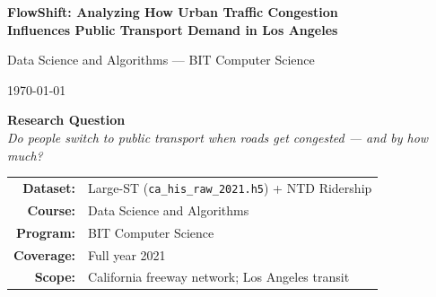 \documentclass[12pt,a4paper]{article}
\begin{document}
\begin{titlepage}
    \centering
    \vspace*{3cm}

    {\fontsize{14}{18}\selectfont\bfseries
    FlowShift: Analyzing How Urban Traffic Congestion\\[8pt]
    Influences Public Transport Demand in Los Angeles\par}

    \vspace{1.2cm}

    {\normalsize Data Science and Algorithms --- BIT Computer Science\par}

    \vspace{0.5cm}

    {\normalsize \today\par}

    \vspace{2cm}

    \begin{tcolorbox}[highlight, width=12cm]
        \centering
        \textbf{Research Question}\\[6pt]
        \textit{Do people switch to public transport when roads get congested --- and by how much?}
    \end{tcolorbox}

    \vspace{1.5cm}

    \begin{tabular}{rl}
        \textbf{Dataset:}   & Large-ST (\texttt{ca\_his\_raw\_2021.h5}) + NTD Ridership \\[6pt]
        \textbf{Course:}    & Data Science and Algorithms \\[6pt]
        \textbf{Program:}   & BIT Computer Science \\[6pt]
        \textbf{Coverage:}  & Full year 2021 \\[6pt]
        \textbf{Scope:}     & California freeway network; Los Angeles transit \\
    \end{tabular}

\end{titlepage}

{
  \setlength{\parskip}{0pt}
  \setlength{\baselineskip}{0pt}
  \tableofcontents
}
\newpage

\end{document}
